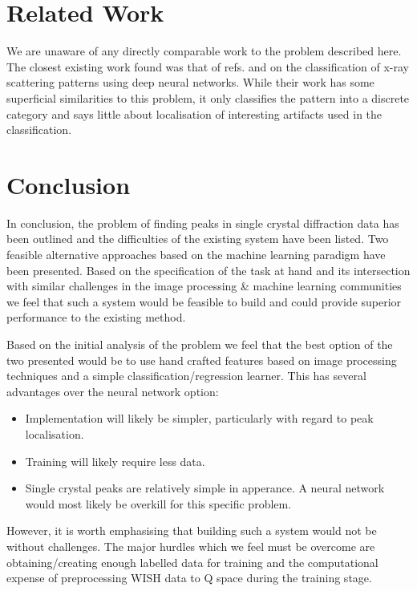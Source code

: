 \documentclass[paper=a4, fontsize=8pt]{scrartcl} \usepackage[T1]{fontenc}
\begin{document}
\section{Related Work}
We are unaware of any directly comparable work to the problem described here. 
The closest existing work found was that of refs.\cite{kiapour2014materials} and 
\cite{wang2016x} on the classification of x-ray scattering patterns using deep 
neural networks. While their work has some superficial similarities to this 
problem, it only classifies the pattern into a discrete category and says 
little about localisation of interesting artifacts used in the classification.

\section{Conclusion}
In conclusion, the problem of finding peaks in single crystal diffraction data 
has been outlined and the difficulties of the existing system have been listed.
Two feasible alternative approaches based on the machine learning paradigm have 
been presented. Based on the specification of the task at hand and its intersection
with similar challenges in the image processing \& machine learning communities
we feel that such a system would be feasible to build and could provide 
superior performance to the existing method. 

Based on the initial analysis of the problem we feel that the best option of the
two presented would be to use hand crafted features based on image 
processing techniques and a simple classification/regression learner. This has 
several advantages over the neural network option:

\begin{itemize}
    \item Implementation will likely be simpler, particularly with regard to peak localisation.
    \item Training will likely require less data.
    \item Single crystal peaks are relatively simple in apperance. A neural network would most likely be overkill for this specific problem.
\end{itemize}

However, it is worth emphasising that building such a system would not be without 
challenges. The major hurdles which we feel must be overcome are obtaining/creating 
enough labelled data for training and the computational expense of preprocessing 
WISH data to Q space during the training stage. 
\end{document}
